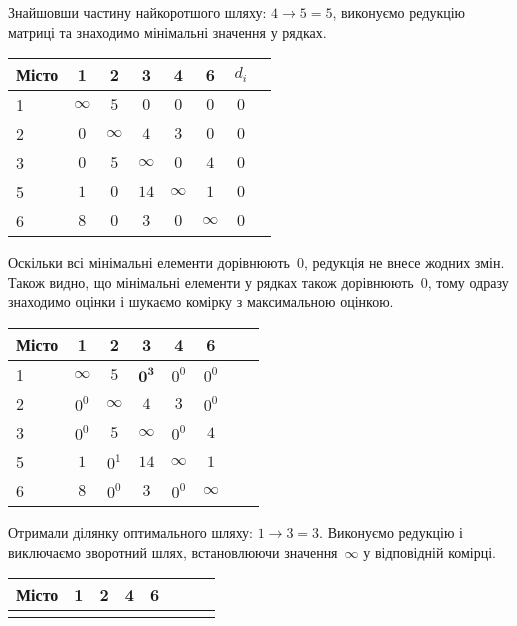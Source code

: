\documentclass[a4paper,oneside,DIV=12,12pt]{scrartcl}
\begin{document}
\begin{solution}
		Знайшовши частину найкоротшого шляху: $4 \to 5 = 5$, виконуємо редукцію матриці та знаходимо мінімальні значення у рядках.
		
		\begin{longtable}[c]{lccccccr}
			\toprule
				Місто & 1 & 2 & 3 & 4 & 6 & $d_i$\\
			\midrule
			\endhead
			\bottomrule
			\endfoot
			
				1     & $\infty$ & $5$      & $0$      & $0$      & $0$      & $0$\\
				2     & $0$      & $\infty$ & $4$      & $3$      & $0$      & $0$\\
				3     & $0$      & $5$      & $\infty$ & $0$      & $4$      & $0$\\
				5     & $1$      & $0$      & $14$     & $\infty$ & $1$      & $0$\\
				6     & $8$      & $0$      & $3$      & $0$      & $\infty$ & $0$\\
		\end{longtable}
		
		Оскільки всі мінімальні елементи дорівнюють~$0$, редукція не внесе жодних змін. Також видно, що мінімальні елементи у рядках також дорівнюють~$0$, тому одразу знаходимо оцінки і шукаємо комірку з максимальною оцінкою.
		\begin{longtable}[c]{lccccccr}
			\toprule
				Місто & 1 & 2 & 3 & 4 & 6 \\
			\midrule
			\endhead
			\bottomrule
			\endfoot
			
				1     & $\infty$ & $5$      & $\mathbf{0^3}$ & $0^0$    & $0^0$\\
				2     & $0^0$    & $\infty$ & $4$            & $3$      & $0^0$\\
				3     & $0^0$    & $5$      & $\infty$       & $0^0$    & $4$\\
				5     & $1$      & $0^1$    & $14$           & $\infty$ & $1$\\
				6     & $8$      & $0^0$    & $3$            & $0^0$    & $\infty$\\
		\end{longtable}
		
		Отримали ділянку оптимального шляху: $1 \to 3 = 3$. Виконуємо редукцію і виключаємо зворотний шлях, встановлюючи значення~$\infty$ у відповідній комірці.
		
		\begin{longtable}[c]{lccccccr}
			\toprule
				Місто & 1 & 2 & 4 & 6 \\
			\midrule
			\endhead
			\bottomrule
			\endfoot
			

\end{longtable}
\end{solution}
\end{document}
